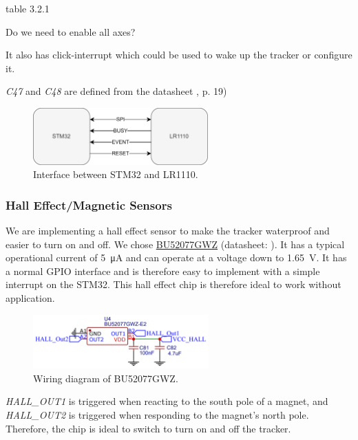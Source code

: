 table 3.2.1 

Do we need to enable all axes?

It also has click-interrupt which could be used to wake up the tracker or configure it.

\textit{C47} and \textit{C48} are defined from the datasheet , p. 19)

\begin{figure}[H]
    \centering
    \includegraphics[width=0.6\textwidth]{figures/STM32_LR1110_interface.png}
    \caption{Interface between STM32 and LR1110.}
    \label{fig:stm32_lr1110_interface}
\end{figure}

\subsubsection{Hall Effect/Magnetic Sensors}
We are implementing a hall effect sensor to make the tracker waterproof and easier to turn on and off. We chose \hyperref[bom:bu52077gwz]{BU52077GWZ} (datasheet: ). It has a typical operational current of \SI{5}{\micro\ampere} and can operate at a voltage down to \SI{1.65}{\volt}. It has a normal \ac{GPIO} interface and is therefore easy to implement with a simple interrupt on the STM32. This hall effect chip is therefore ideal to work without application.

\begin{figure}[H]
  \centering
  \includegraphics[width=0.6\textwidth]{figures/Hall.PNG}
  \caption{Wiring diagram of BU52077GWZ.}
  \label{fig:schematic:BU52077GWZ}
\end{figure}

\textit{HALL\_OUT1} is triggered when reacting to the south pole of a magnet, and \textit{HALL\_OUT2} is triggered when responding to the magnet's north pole. Therefore, the chip is ideal to switch to turn on and off the tracker.

